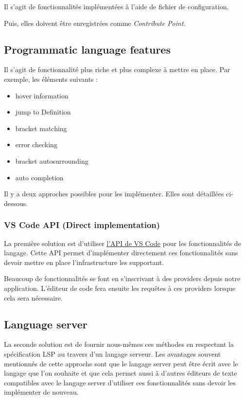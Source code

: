 \documentclass[
    iict, %
    il, %
]{heig-tb}
\begin{document}
Il s'agit de fonctionnalités implémentées à l'aide de fichier de configuration.

Puis, elles doivent être enregistrées comme \emph{Contribute Point}.

\subsection{Programmatic language features}\label{Programmatic language features}
Il s'agit de fonctionnalité plus riche et plus complexe à mettre en place.
Par exemple, les éléments suivants :

\begin{itemize}
    \item hover information
    \item jump to Definition
    \item bracket matching
    \item error checking
    \item bracket autosurrounding
    \item auto completion
\end{itemize}

Il y a deux approches possibles pour les implémenter. Elles sont détaillées ci-dessous.

\subsubsection{VS Code API (Direct implementation)}
La première solution est d'utiliser \href{https://code.visualstudio.com/api/references/vscode-api#languages}{l'API de VS Code} pour les fonctionnalités de langage.
Cette API permet d'implémenter directement ces fonctionnalités sans devoir mettre en place l'infrastructure les supportant.

Beaucoup de fonctionnalités se font en s'inscrivant à des providers depuis notre application.
L'éditeur de code fera ensuite les requêtes à ces providers lorsque cela sera nécessaire.

\subsection{Language server}

La seconde solution est de fournir nous-mêmes ces méthodes en respectant la spécification LSP \cite{lsp-specification} au travers d'un langage serveur.
Les avantages souvent mentionnés de cette approche sont que le langage server peut être écrit avec le langage que l'on souhaite et
que cela permet aussi à d'autres éditeurs de texte compatibles avec le langage server d'utiliser ces fonctionnalités sans devoir les implémenter de nouveau.
\end{document}
